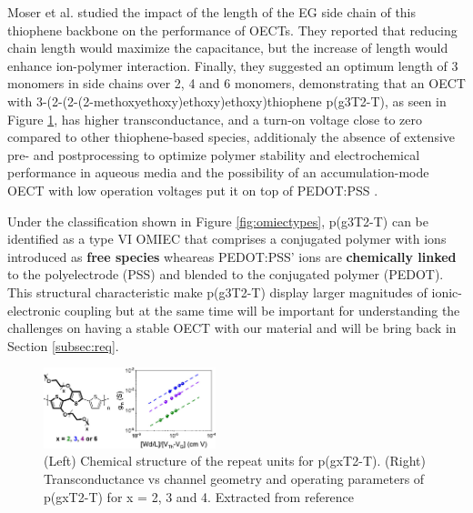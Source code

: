 Moser et al. studied the impact of the length of the EG side chain of this thiophene backbone on the performance of OECTs. They reported that reducing chain length would maximize the capacitance, but the increase of length would enhance ion-polymer interaction. Finally, they suggested an optimum length of 3 monomers in side chains over 2, 4 and 6 monomers, demonstrating that an OECT with 3-(2-(2-(2-methoxyethoxy)ethoxy)ethoxy)thiophene p(g3T2-T), as seen in Figure \ref{fig:pg3t}, has higher transconductance, and a turn-on voltage close to zero compared to other thiophene-based species, additionaly the absence of extensive pre- and postprocessing to optimize polymer stability and electrochemical performance in aqueous media and the possibility of an accumulation-mode OECT with low operation voltages put it on top of PEDOT:PSS \cite{moserEthyleneGlycolBasedSide2020}.



Under the classification shown in Figure \ref{fig:omiectypes}, p(g3T2-T) can be identified as a type VI OMIEC that comprises a conjugated polymer with ions introduced as \textbf{free species} wheareas PEDOT:PSS' ions are \textbf{chemically linked} to the polyelectrode (PSS) and blended to the conjugated polymer (PEDOT). This structural characteristic make p(g3T2-T) display larger magnitudes of ionic-electronic coupling but at the same time will be important for understanding the challenges on having a stable OECT with our material and will be bring back in Section \ref{subsec:req}.


\begin{figure}
  \centering
  \includegraphics[width=5cm]{Images/pg3t+perf.jpeg}
  \caption{(Left) Chemical structure of the repeat units for p(gxT2-T). (Right) Transconductance vs channel geometry and operating parameters of p(gxT2-T) for x = 2, 3 and 4. Extracted from reference \cite{moserEthyleneGlycolBasedSide2020}}
  \label{fig:pg3t}
\end{figure}


